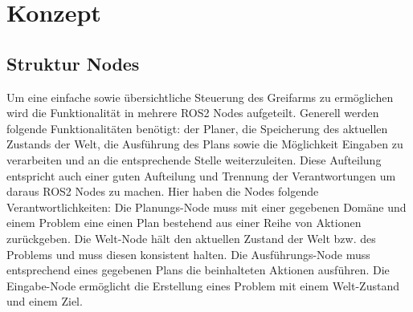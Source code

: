 \section{Konzept}
\subsection{Struktur Nodes}
Um eine einfache sowie übersichtliche Steuerung des Greifarms zu ermöglichen wird die Funktionalität in mehrere ROS2 Nodes aufgeteilt. Generell werden folgende Funktionalitäten benötigt: der Planer, die Speicherung des aktuellen Zustands der Welt, die Ausführung des Plans sowie die Möglichkeit Eingaben zu verarbeiten und an die entsprechende Stelle weiterzuleiten.\newline
Diese Aufteilung entspricht auch einer guten Aufteilung und Trennung der Verantwortungen um daraus ROS2 Nodes zu machen. Hier haben die Nodes folgende Verantwortlichkeiten:\newline
Die Planungs-Node muss mit einer gegebenen Domäne und einem Problem eine einen Plan bestehend aus einer Reihe von Aktionen zurückgeben.\newline
Die Welt-Node hält den aktuellen Zustand der Welt bzw. des Problems und muss diesen konsistent halten.\newline
Die Ausführungs-Node muss entsprechend eines gegebenen Plans die beinhalteten Aktionen ausführen.\newline
Die Eingabe-Node ermöglicht die Erstellung eines Problem mit einem Welt-Zustand und einem Ziel.